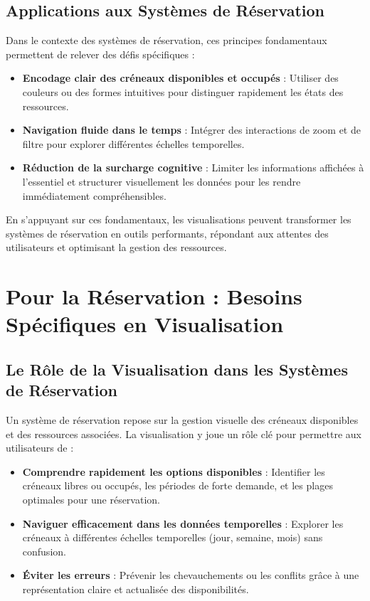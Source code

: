 \documentclass[runningheads]{llncs}
\begin{document}
\subsection{Applications aux Systèmes de Réservation}
Dans le contexte des systèmes de réservation, ces principes fondamentaux permettent de relever des défis spécifiques :
\begin{itemize}
    \item \textbf{Encodage clair des créneaux disponibles et occupés} : Utiliser des couleurs ou des formes intuitives pour distinguer rapidement les états des ressources.
    \item \textbf{Navigation fluide dans le temps} : Intégrer des interactions de zoom et de filtre pour explorer différentes échelles temporelles.
    \item \textbf{Réduction de la surcharge cognitive} : Limiter les informations affichées à l’essentiel et structurer visuellement les données pour les rendre immédiatement compréhensibles.
\end{itemize}

En s'appuyant sur ces fondamentaux, les visualisations peuvent transformer les systèmes de réservation en outils performants, répondant aux attentes des utilisateurs et optimisant la gestion des ressources.

\section{Pour la Réservation : Besoins Spécifiques en Visualisation}

\subsection{Le Rôle de la Visualisation dans les Systèmes de Réservation}
Un système de réservation repose sur la gestion visuelle des créneaux disponibles et des ressources associées. La visualisation y joue un rôle clé pour permettre aux utilisateurs de :
\begin{itemize}
    \item \textbf{Comprendre rapidement les options disponibles} : Identifier les créneaux libres ou occupés, les périodes de forte demande, et les plages optimales pour une réservation.
    \item \textbf{Naviguer efficacement dans les données temporelles} : Explorer les créneaux à différentes échelles temporelles (jour, semaine, mois) sans confusion.
    \item \textbf{Éviter les erreurs} : Prévenir les chevauchements ou les conflits grâce à une représentation claire et actualisée des disponibilités.
\end{itemize}
\end{document}
